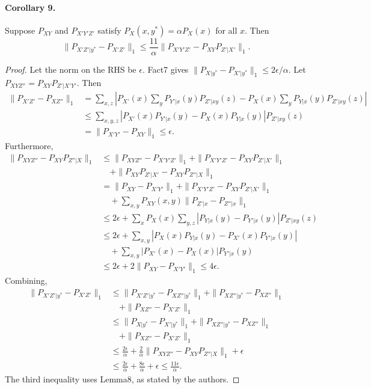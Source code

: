 \documentclass[10pt,a4paper]{article}
\begin{document}
\paragraph{Corollary 9.} Suppose $P_{XY}$ and $P_{X'Y'Z'}$ satisfy $P_X(x,y^*)=\alpha P_X(x)$ for all $x$. Then
\[\|P_{X'Z'|y^*}-P_{X'Z'}\|_1\le\frac{11}\alpha\|P_{X'Y'Z'}-P_{XY}P_{Z'|X'}\|_1.\]
\begin{proof}Let the norm on the RHS be $\epsilon$. Fact7 gives $\|P_{X|y^*}-P_{X'|y^*}\|_1\le2\epsilon/\alpha$. Let $P_{XYZ''}=P_{XY}P_{Z'|X'Y'}$. Then
\begin{align*}\|P_{X'Z'}-P_{XZ''}\|_1&=\sum_{x,z}\left|P_{X'}(x)\sum_yP_{Y'|x}(y)P_{Z'|xy}(z)-P_X(x)\sum_yP_{Y|x}(y)P_{Z'|xy}(z)\right|\\&\le\sum_{x,y,z}|P_{X'}(x)P_{Y'|x}(y)-P_X(x)P_{Y|x}(y)|P_{Z'|xy}(z)\\&=\|P_{X'Y'}-P_{XY}\|_1\le\epsilon.
\end{align*}
Furthermore,
\begin{align*}\|P_{XYZ''}-P_{XY}P_{Z''|X}\|_1&\le\|P_{XYZ''}-P_{X'Y'Z'}\|_1+\|P_{X'Y'Z'}-P_{XY}P_{Z'|X'}\|_1\\&\quad+\|P_{XY}P_{Z'|X'}-P_{XY}P_{Z''|X}\|_1\\&=\|P_{XY}-P_{X'Y'}\|_1+\|P_{X'Y'Z'}-P_{XY}P_{Z'|X'}\|_1\\&\quad+\sum_{x,y}P_{XY}(x,y)\|P_{Z'|x}-P_{Z''|x}\|_1\\&\le2\epsilon+\sum_xP_X(x)\sum_{y,z}|P_{Y|x}(y)-P_{Y'|x}(y)|P_{Z'|xy}(z)\\&\le2\epsilon+\sum_{x,y}|P_X(x)P_{Y|x}(y)-P_{X'}(x)P_{Y'|x}(y)|\\&\quad+\sum_{x,y}|P_{X'}(x)-P_X(x)|P_{Y'|x}(y)\\&\le2\epsilon+2\|P_{XY}-P_{X'Y'}\|_1\le4\epsilon.
\end{align*}
Combining,
\begin{align*}\|P_{X'Z'|y^*}-P_{X'Z'}\|_1&\le\|P_{X'Z'|y^*}-P_{XZ''|y^*}\|_1+\|P_{XZ''|y^*}-P_{XZ''}\|_1\\&\quad+\|P_{XZ''}-P_{X'Z'}\|_1\\&\le\|P_{X|y^*}-P_{X'|y^*}\|_1+\|P_{XZ''|y^*}-P_{XZ''}\|_1\\&\quad+\|P_{XZ''}-P_{X'Z'}\|_1\\&\le\frac{2\epsilon}\alpha+\frac2\alpha\|P_{XYZ''}-P_{XY}P_{Z''|X}\|_1+\epsilon\\&\le\frac{2\epsilon}\alpha+\frac{8\epsilon}\alpha+\epsilon\le\frac{11\epsilon}\alpha.
\end{align*}
The third inequality uses Lemma8, as stated by the authors.\end{proof}
\end{document}
